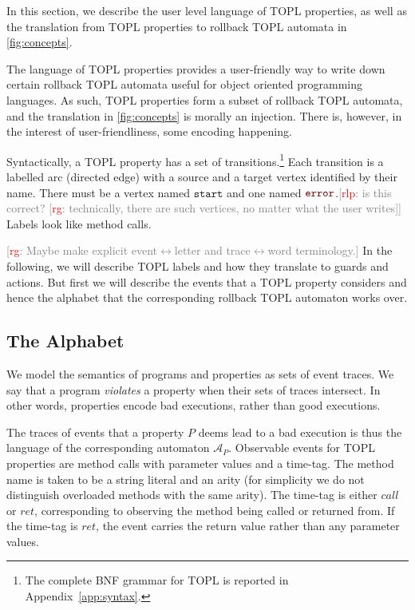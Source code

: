 \documentclass[9pt, preprint]{sigplanconf} %
\newcommand{\noterg}[2]{\textcolor{gray}{[\textcolor{red}{#1}: #2]}}
\newcommand{\rg}[1]{\noterg{rg}{#1}}
\newcommand{\rlp}[1]{\noterg{rlp}{#1}}
\newcommand{\A}{\ensuremath{\mathcal{A}}}
\newcommand{\error}{\ensuremath{\textcolor{darkred}{\mathtt{error}}}\xspace}
\newcommand{\start}{\ensuremath{\mathtt{start}}\xspace}
\theoremstyle{definition}
\theoremstyle{remark}
\begin{document}
In this section, we describe the user level language of TOPL
properties, as well as the translation from TOPL properties to
rollback TOPL automata in \autoref{fig:concepts}.

The language of TOPL properties provides a user-friendly way to write down certain
rollback TOPL automata useful for object oriented programming
languages. As such, TOPL properties form a subset of rollback TOPL
automata, and the translation in \autoref{fig:concepts} is morally an
injection. There is, however, in the interest of user-friendliness,
some encoding happening.

Syntactically, a TOPL property has a set of transitions.\footnote{The complete BNF grammar for TOPL is reported in Appendix~\ref{app:syntax}.}
Each transition is a labelled arc (directed edge) with a source and a
target vertex identified by their name.
There must be a vertex named \start and one named \error.\rlp{is
this correct? \rg{technically, there are such vertices, no matter what the user writes}}
Labels look like method calls.

\rg{Maybe make explicit event$\leftrightarrow$letter and trace$\leftrightarrow$word terminology.}
In the following, we will describe TOPL labels and how they translate to guards
and actions. But first we will describe the events that a TOPL
property considers and hence the alphabet that the corresponding
rollback TOPL automaton works over.

\subsection{The Alphabet}

We model the semantics of programs and properties as sets of event
traces. We say that a program \emph{violates} a property when their sets of traces intersect.
In other words, properties encode bad executions, rather than good executions.

The traces of events that a property $P$ deems lead to a bad execution is thus the language
of the corresponding automaton $\A_P$. Observable events for TOPL properties are method calls
with parameter values and a time-tag. The method name is taken to be a
string literal and an arity (for simplicity we do not distinguish
overloaded methods with the same arity). The time-tag is either $call$ or $ret$,
corresponding to observing the method being called or returned
from. If the time-tag is $ret$, the event carries the return value
rather than any parameter values.
\end{document}
